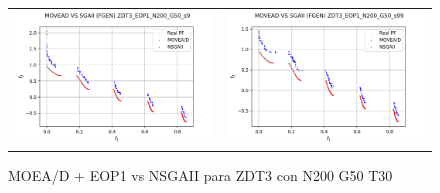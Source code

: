 \begin{figure}[H]
\begin{tabular}{c c}
    \includegraphics[scale=0.5]{figures/ZDT3_EOP1_N200_G50_T30/s9_comp.png} &
    \includegraphics[scale=0.5]{figures/ZDT3_EOP1_N200_G50_T30/s99_comp.png}\\
    \end{tabular}
    \caption{\centering MOEA/D + EOP1 vs NSGAII para ZDT3 con N200 G50 T30}
    \label{fig:7}
\end{figure}

